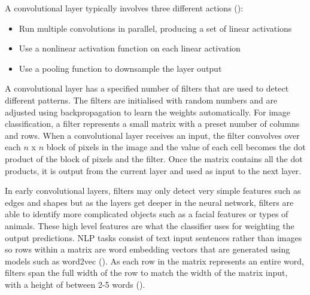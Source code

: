 A convolutional layer typically involves three different actions (\cite{goodfellow_deep_learning_2016}):
\begin{itemize}
    \item Run multiple convolutions in parallel, producing a set of linear activations
    \item Use a nonlinear activation function on each linear activation
    \item Use a pooling function to downsample the layer output
\end{itemize}


A convolutional layer has a specified number of filters that are used to detect different patterns. The filters are initialised with random numbers and are adjusted using backpropagation to learn the weights automatically. For image classification, a filter represents a small matrix with a preset number of columns and rows.
When a convolutional layer receives an input, the filter convolves over each $n$ x $n$ block of pixels in the image and the value of each cell becomes the dot product of the block of pixels and the filter. Once the matrix contains all the dot products, it is output from the current layer and used as input to the next layer.

In early convolutional layers, filters may only detect very simple features such as edges and shapes but as the layers get deeper in the neural network, filters are able to identify more complicated objects such as a facial features or types of animals. These high level features are what the classifier uses for weighting the output predictions.
\acrshort{NLP} tasks consist of text input sentences rather than images so rows within a matrix are word embedding vectors that are generated using models such as word2vec (\cite{mikolov_word2vec_2013}). 
As each row in the matrix represents an entire word, filters span the full width of the row to match the width of the matrix input, with a height of between 2-5 words (\cite{lopez_deep_2017}).

